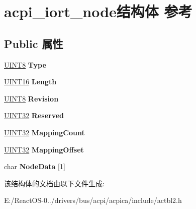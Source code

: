 \hypertarget{structacpi__iort__node}{}\section{acpi\+\_\+iort\+\_\+node结构体 参考}
\label{structacpi__iort__node}
\subsection*{Public 属性}
\begin{DoxyCompactItemize}
\item 
\mbox{\label{structacpi__iort__node_aa7059312d4bd3367eeecaefaece19903}} 
\hyperlink{_processor_bind_8h_ab27e9918b538ce9d8ca692479b375b6a}{U\+I\+N\+T8} {\bfseries Type}
\item 
\mbox{\label{structacpi__iort__node_aa6c825e885cd4c2d16df10ff7cdc4d20}} 
\hyperlink{_processor_bind_8h_a09f1a1fb2293e33483cc8d44aefb1eb1}{U\+I\+N\+T16} {\bfseries Length}
\item 
\mbox{\label{structacpi__iort__node_ad00bbe007bb507c924b2eafea8600b60}} 
\hyperlink{_processor_bind_8h_ab27e9918b538ce9d8ca692479b375b6a}{U\+I\+N\+T8} {\bfseries Revision}
\item 
\mbox{\label{structacpi__iort__node_a9cb3072b56a5b8e74fcd5d531f10c5b2}} 
\hyperlink{_processor_bind_8h_ae1e6edbbc26d6fbc71a90190d0266018}{U\+I\+N\+T32} {\bfseries Reserved}
\item 
\mbox{\label{structacpi__iort__node_a008a2d30c6547f5466ad17a4618c31b1}} 
\hyperlink{_processor_bind_8h_ae1e6edbbc26d6fbc71a90190d0266018}{U\+I\+N\+T32} {\bfseries Mapping\+Count}
\item 
\mbox{\label{structacpi__iort__node_a0096cb7d14883c9e8a1a21887e1ef5fb}} 
\hyperlink{_processor_bind_8h_ae1e6edbbc26d6fbc71a90190d0266018}{U\+I\+N\+T32} {\bfseries Mapping\+Offset}
\item 
\mbox{\label{structacpi__iort__node_a7a494691239279669746c917201471c9}} 
char {\bfseries Node\+Data} \mbox{[}1\mbox{]}
\end{DoxyCompactItemize}


该结构体的文档由以下文件生成\+:\begin{DoxyCompactItemize}
\item 
E\+:/\+React\+O\+S-\/0../drivers/bus/acpi/acpica/include/actbl2.\+h\end{DoxyCompactItemize}
